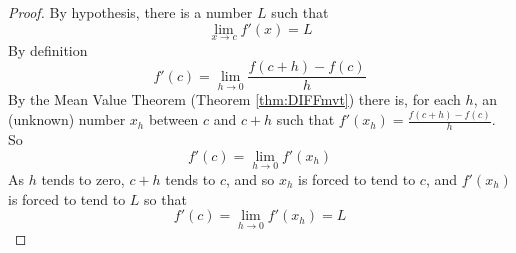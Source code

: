 \begin{proof}
By hypothesis, there is a number $L$ such that
\begin{equation*}
\lim_{x\rightarrow c}f'(x) = L
\end{equation*}
By definition
\begin{equation*}
f'(c) = \lim_{h\to 0}\frac{f(c+h)-f(c)}{h}
\end{equation*}
By the Mean Value Theorem (Theorem \ref{thm:DIFFmvt}) 
there is, for each $h$,
an (unknown) number $x_h$ between $c$ and $c+h$ such that 
$f'(x_h)=\frac{f(c+h)-f(c)}{h}$. So
\begin{equation*}
f'(c) = \lim_{h\to 0} f'(x_h)
\end{equation*}
As $h$ tends to zero, $c+h$ tends to $c$, and so  $x_h$ is forced to tend 
to $c$, and $f'(x_h)$ is forced to tend to $L$ so that
\begin{equation*}
f'(c) = \lim_{h\to 0} f'(x_h) = L
\end{equation*}
\end{proof}


